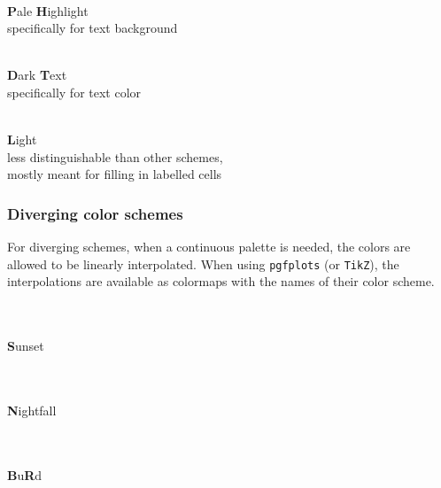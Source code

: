 \documentclass{scrartcl}
\begin{document}
\begin{minipage}{0.5\textwidth}
    \centering
    \\
    \textbf{P}ale \textbf{H}ighlight\\
    specifically for text background
\end{minipage}\hfill%
\begin{minipage}{0.5\textwidth}
    \centering
    \\
    \textbf{D}ark \textbf{T}ext\\
    specifically for text color
\end{minipage}

\begin{center}
    \\
    \textbf{L}ight\\
    less distinguishable than other schemes,\\ mostly meant for filling in labelled cells
\end{center}\clearpage

\subsubsection{Diverging color schemes}\label{sec:T-D}
For diverging schemes, when a continuous palette is needed, the colors are allowed to be linearly interpolated.
When using \verb!pgfplots! (or \verb!TikZ!), the interpolations are available as colormaps with the names of their color scheme.

\begin{center}
    \\
    \\
    \textbf{S}unset
\end{center}

\begin{center}
    \\
    \\
    \textbf{N}ightfall
\end{center}

\begin{center}
    \\
    \\
    \textbf{B}u\textbf{R}d
\end{center}
\end{document}
